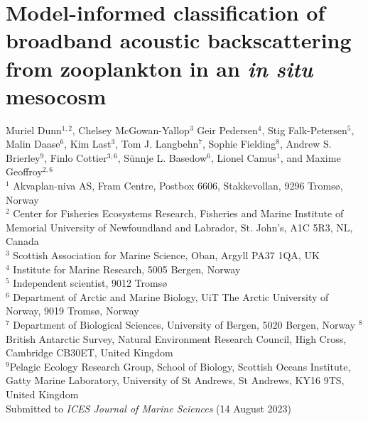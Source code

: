 \chapter{Model-informed classification of broadband acoustic backscattering from zooplankton in an \textit{in situ} mesocosm}
\label{chap:modelled}



Muriel Dunn$^{1,2}$, Chelsey McGowan-Yallop$^3$ Geir Pedersen$^4$, Stig Falk-Petersen$^5$, Malin Daase$^6$, Kim Last$^3$, Tom J. Langbehn$^7$, Sophie Fielding$^8$, Andrew S. Brierley$^9$, Finlo Cottier$^{3,6}$, S\"{u}nnje L. Basedow$^6$, Lionel Camus$^1$, and Maxime Geoffroy$^{2,6}$\\

$^1$ Akvaplan-niva AS, Fram Centre, Postbox 6606, Stakkevollan, 9296 Tromsø, Norway \\
$^2$ Center for Fisheries Ecosystems Research, Fisheries and Marine Institute of Memorial University of Newfoundland and Labrador, St. John's, A1C 5R3, NL, Canada\\
$^3$ Scottish Association for Marine Science, Oban, Argyll PA37 1QA, UK\\
$^4$ Institute for Marine Research, 5005 Bergen, Norway\\
$^5$ Independent scientist, 9012 Tromsø\\
$^6$ Department of Arctic and Marine Biology, UiT The Arctic University of Norway, 9019 Tromsø, Norway\\
$^7$ Department of Biological Sciences, University of Bergen, 5020 Bergen, Norway
$^8$British Antarctic Survey, Natural Environment Research Council, High Cross, Cambridge CB30ET, United Kingdom \\
$^9$Pelagic Ecology Research Group, School of Biology, Scottish Oceans Institute, Gatty Marine Laboratory, University of St Andrews, St Andrews, KY16 9TS, United Kingdom \\


Submitted to \textit{ICES Journal of Marine Sciences} (14 August 2023) \\

